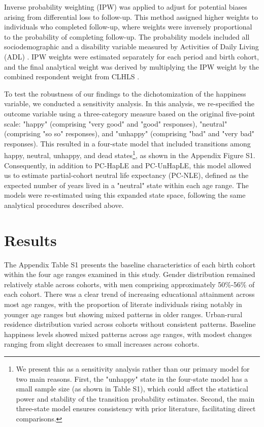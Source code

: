 \documentclass[12pt, a4paper]{article}
\begin{document}
Inverse probability weighting (IPW) was applied to adjust for potential biases arising from differential loss to follow-up. This method assigned higher weights to individuals who completed follow-up, where weights were inversely proportional to the probability of completing follow-up. The probability models included all sociodemographic and a disability variable measured by Activities of Daily Living (ADL) \autocite{payne.2022.expansion,liu.2019.are,shen.2023.disability}. IPW weights were estimated separately for each period and birth cohort, and the final analytical weight was derived by multiplying the IPW weight by the combined respondent weight from CLHLS \autocite{dugoff.2014.generalizing,liu.2019.are}.

To test the robustness of our findings to the dichotomization of the happiness variable, we conducted a sensitivity analysis. In this analysis, we re-specified the outcome variable using a three-category measure based on the original five-point scale: "happy" (comprising "very good" and "good" responses), "neutral" (comprising "so so" responses), and "unhappy" (comprising "bad" and "very bad" responses). This resulted in a four-state model that included transitions among happy, neutral, unhappy, and dead states\footnote{We present this as a sensitivity analysis rather than our primary model for two main reasons. First, the "unhappy" state in the four-state model has a small sample size (as shown in Table S1), which could affect the statistical power and stability of the transition probability estimates. Second, the main three-state model ensures consistency with prior literature, facilitating direct comparisons.}, as shown in the Appendix Figure S1. Consequently, in addition to PC-HapLE and PC-UnHapLE, this model allowed us to estimate partial-cohort neutral life expectancy (PC-NLE), defined as the expected number of years lived in a "neutral" state within each age range. The models were re-estimated using this expanded state space, following the same analytical procedures described above.

\section{Results}
The Appendix Table S1 presents the baseline characteristics of each birth cohort within the four age ranges examined in this study. Gender distribution remained relatively stable across cohorts, with men comprising approximately 50\%-56\% of each cohort. There was a clear trend of increasing educational attainment across most age ranges, with the proportion of literate individuals rising notably in younger age ranges but showing mixed patterns in older ranges. Urban-rural residence distribution varied across cohorts without consistent patterns. Baseline happiness levels showed mixed patterns across age ranges, with modest changes ranging from slight decreases to small increases across cohorts.
\end{document}
